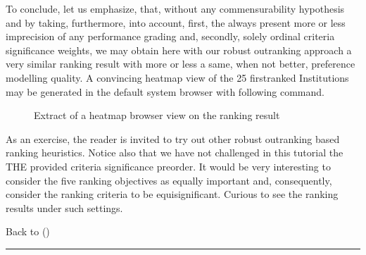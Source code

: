 \documentclass[a4paper,12pt,english]{sphinxhowto}
\begin{document}
To conclude, let us emphasize, that, without any commensurability hypothesis and by taking, furthermore, into account, first, the always present more or less imprecision of any performance grading and, secondly, solely ordinal criteria significance weights, we may obtain here with our robust outranking approach a very similar ranking result with more or less a same, when not better, preference modelling quality. A convincing heatmap view of the 25 first\sphinxhyphen{}ranked Institutions may be generated in the default system browser with following command.

\begin{sphinxVerbatim}[commandchars=\\\{\},numbers=left,firstnumber=1,stepnumber=1]
\PYGZbs{}
\end{sphinxVerbatim}

\begin{figure}[H]
\centering
\capstart

\noindent{}
\caption{Extract of a heatmap browser view on the  ranking result}\label{\detokenize{tutorial:id189}}\end{figure}

As an exercise, the reader is invited to try out other robust outranking based ranking heuristics. Notice also that we have not challenged in this tutorial the THE provided criteria significance preorder. It would be very interesting to consider the five ranking objectives as equally important and, consequently, consider the ranking criteria to be equisignificant. Curious to see the ranking results under such settings.

Back to {\hyperref[\detokenize{tutorial:tutorial-label}]{}} ()


\bigskip\hrule\bigskip
\end{document}
